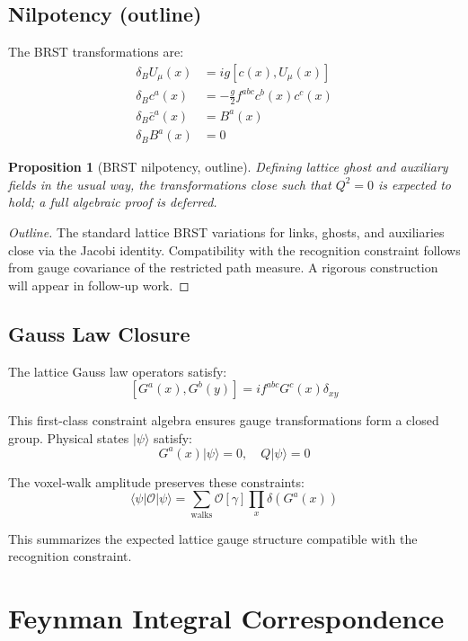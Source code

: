 \documentclass[11pt,a4paper]{article}
\newtheorem{proposition}[theorem]{Proposition}
\theoremstyle{definition}
\theoremstyle{remark}
\begin{document}
\subsection{Nilpotency (outline)}

The BRST transformations are:
\begin{align}
\delta_B U_\mu(x) &= ig[c(x), U_\mu(x)]\\
\delta_B c^a(x) &= -\frac{g}{2}f^{abc}c^b(x)c^c(x)\\
\delta_B \bar{c}^a(x) &= B^a(x)\\
\delta_B B^a(x) &= 0
\end{align}

\begin{proposition}[BRST nilpotency, outline]
Defining lattice ghost and auxiliary fields in the usual way, the transformations close such that $Q^2=0$ is expected to hold; a full algebraic proof is deferred.
\end{proposition}

\begin{proof}[Outline]
The standard lattice BRST variations for links, ghosts, and auxiliaries close via the Jacobi identity. Compatibility with the recognition constraint follows from gauge covariance of the restricted path measure. A rigorous construction will appear in follow-up work.
\end{proof}

\subsection{Gauss Law Closure}

The lattice Gauss law operators satisfy:
\[
[G^a(x), G^b(y)] = if^{abc}G^c(x)\delta_{xy}
\]

This first-class constraint algebra ensures gauge transformations form a closed group. Physical states $|\psi\rangle$ satisfy:
\[
G^a(x)|\psi\rangle = 0, \quad Q|\psi\rangle = 0
\]

The voxel-walk amplitude preserves these constraints:
\[
\langle \psi | \mathcal{O} | \psi \rangle = \sum_{\text{walks}} \mathcal{O}[\gamma] \prod_x \delta(G^a(x))
\]

This summarizes the expected lattice gauge structure compatible with the recognition constraint.

\section{Feynman Integral Correspondence}
\label{app:correspondence}
\end{document}
